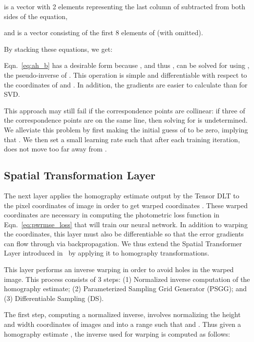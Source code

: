 \documentclass[letterpaper, 10 pt, conference]{ieeeconf}
\begin{document}
 is a vector with 2 elements representing the last column of  subtracted from both sides of the equation, 
  
and  is a vector consisting of the first 8 elements of  (with  omitted).

By stacking these equations, we get:

 

Eqn.~\eqref{eq:ah_b} has a desirable form because , and thus , can be solved for using , the pseudo-inverse of .  This operation is simple and differentiable with respect to the coordinates of  and . In addition, the gradients are easier to calculate than for SVD.

This approach may still fail if the correspondence points are collinear: if three of the correspondence points are on the same line, then solving for  is undetermined. We alleviate this problem by first making the initial guess of  to be zero, implying that . We then set a small learning rate such that after each training iteration,  does not move too far away from  .





 






\subsection{Spatial Transformation Layer}
The next layer applies the  homography estimate  output by the Tensor DLT to the pixel coordinates  of image  in order to get warped coordinates . These warped coordinates are necessary in computing the photometric loss function in Eqn.~\eqref{eq:pwrmse_loss} that will train our neural network. In addition to warping the coordinates, this layer must also be differentiable so that the error gradients can flow through via backpropagation. We thus extend the Spatial Transformer Layer introduced in~\cite{jaderberg2015spatial} by applying it to homography transformations.

This layer performs an inverse warping in order to avoid holes in the warped image. This process consists of 3 steps: (1) Normalized inverse computation  of the homography estimate; (2) Parameterized Sampling Grid Generator (PSGG); and (3) Differentiable Sampling (DS). 

The first step, computing a normalized inverse, involves normalizing the height and width coordinates of images  and  into a range such that  and . Thus given a  homography estimate , the inverse  used for warping is computed as follows:
\end{document}

